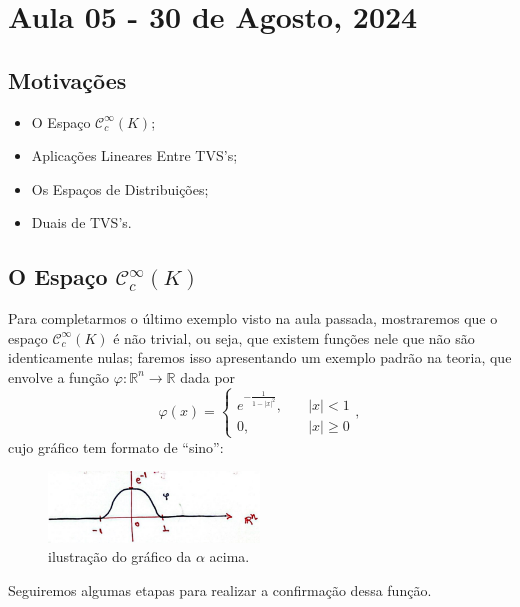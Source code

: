 \documentclass[../distribution_theory_notes.tex]{subfiles}
\begin{document}
\section{Aula 05 - 30 de Agosto, 2024}
\subsection{Motivações}
\begin{itemize}
	\item O Espaço \(\mathcal{C}_{c}^{\infty}(K)\);
	\item Aplicações Lineares Entre TVS's;
	\item Os Espaços de Distribuições;
	\item Duais de TVS's.
\end{itemize}
\subsection{O Espaço \(\mathcal{C}_{c}^{\infty}(K)\)}
Para completarmos o último exemplo visto na aula passada, mostraremos que o espaço \(\mathcal{C}_{c}^{\infty}(K)\) é não trivial, ou seja, que existem funções nele que não são identicamente nulas; faremos isso apresentando um exemplo padrão na teoria, que envolve a função \(\varphi :\mathbb{R}^{n}\rightarrow \mathbb{R}\) dada por
\[
	\varphi(x) = \left\{\begin{array}{ll}
		e^{-\frac{1}{1-|x|^{2}}}, & \quad |x| < 1    \\
		0,                        & \quad  |x|\geq 0
	\end{array}\right.,
\]
cujo gráfico tem formato de ``sino'':
\begin{figure}[H]
	\begin{center}
		\includegraphics[height=0.5\textheight, width=0.5\textwidth, keepaspectratio]{./Images/bell_curve_05.png}
	\end{center}
	\caption{ilustração do gráfico da \(\alpha \) acima.}
\end{figure}

Seguiremos algumas etapas para realizar a confirmação dessa função.
\end{document}
